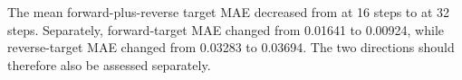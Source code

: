 The mean forward-plus-reverse target MAE decreased from \OldTargetMAE{} at 16 steps to \NewTargetMAE{} at 32 steps. Separately, forward-target MAE changed from 0.01641 to 0.00924, while reverse-target MAE changed from 0.03283 to 0.03694. The two directions should therefore also be assessed separately.
